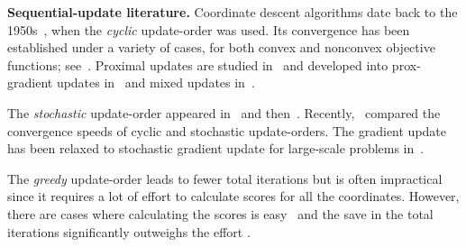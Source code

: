 
\textbf{Sequential-update literature.} Coordinate descent algorithms date back to the 1950s~\cite{hildreth1957quadprog}, when the \emph{cyclic} update-order was used. Its convergence has been established under a variety of cases, for both convex and nonconvex objective functions; see~\cite{Warga-63,zadeh1970note, Sargent-Sebastian-73,Han-88,luo1992convergence, Tseng-93, Grippo-Sciandrone-00, Tseng-01, razaviyayn2013unified, beck2013convergence, hong2015iteration, wright2015coordinate}. Proximal updates are studied in~\cite{Grippo-Sciandrone-00, attouch2010proximal} and developed into prox-gradient updates in~\cite{tseng2009_CGD, tseng2009block-linear, bolte2014proximal} and mixed updates in~\cite{XY_2013_multiblock}.

The \emph{stochastic} update-order appeared in~\cite{nesterov2012cd} and then~\cite{richtarik2014iteration, Lu_Xiao_rbcd_2015}. Recently,~\cite{XY_2014_ecd,Xu2015_APG_NTD} compared the convergence speeds of cyclic and stochastic update-orders. The gradient update has been relaxed to  stochastic gradient update for large-scale problems in~\cite{DangLan-SBMD, XY_2015_bsg}. 

The \emph{greedy} update-order leads to fewer total iterations but is often impractical since it requires a lot of effort to calculate  scores for all the coordinates. However, there are cases where calculating the scores is easy~\cite{bertsekas1999nonlinear, li2009gcoord, wu2008coordinate} and the save in the total iterations significantly outweighs the effort \cite{tseng2009_CGD, dhillon2011nearest, PYY_2013_GRock, schmidt2014coordinate}. 

